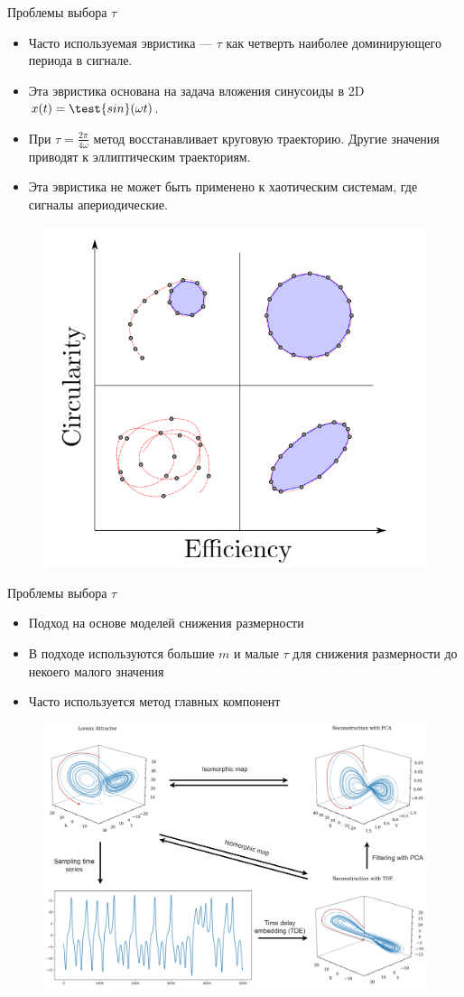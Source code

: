 \begin{frame}{Проблемы выбора $\tau$}
\begin{itemize}
    \item Часто используемая эвристика --- $\tau$ как четверть наиболее доминирующего периода в сигнале.
    \item  Эта эвристика основана на задача вложения синусоиды в 2D $x(t) = \test{sin}(\omega t)$.
    \item  При $ \tau = \frac{2\pi}{4\omega}$ метод восстанавливает круговую траекторию. Другие значения приводят к эллиптическим траекториям.
    \item Эта эвристика не может быть  применено к хаотическим системам, где сигналы апериодические.
\end{itemize}

\begin{figure}
    \includegraphics[width=0.45\linewidth]{lecture_4/figs/2d_case.png}
\end{figure}

\end{frame}
\begin{frame}{Проблемы выбора $\tau$}
\begin{itemize}
    \item Подход на основе моделей снижения размерности
    \item В подходе используются большие $m$ и малые $\tau$ для снижения размерности до некоего малого значения
    \item Часто используется метод главных компонент
\end{itemize}

\begin{figure}
    \includegraphics[width=0.7\linewidth]{lecture_4/figs/init_schema_2.png}
\end{figure}

\end{frame}


